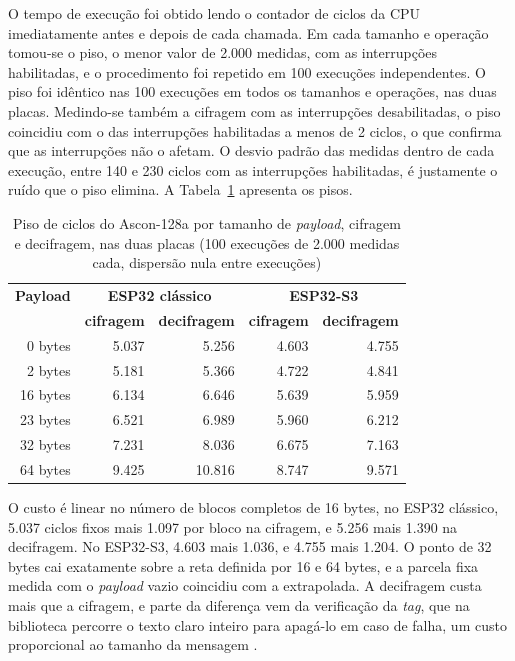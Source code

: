 O tempo de execução foi obtido lendo o contador de ciclos da CPU imediatamente antes e depois de cada chamada. Em cada tamanho e operação tomou-se o piso, o menor valor de 2.000 medidas, com as interrupções habilitadas, e o procedimento foi repetido em 100 execuções independentes. O piso foi idêntico nas 100 execuções em todos os tamanhos e operações, nas duas placas. Medindo-se também a cifragem com as interrupções desabilitadas, o piso coincidiu com o das interrupções habilitadas a menos de 2 ciclos, o que confirma que as interrupções não o afetam. O desvio padrão das medidas dentro de cada execução, entre 140 e 230 ciclos com as interrupções habilitadas, é justamente o ruído que o piso elimina. A Tabela~\ref{tab:tempo_ascon128a} apresenta os pisos.

\begin{table}[htb]
\centering
\caption{Piso de ciclos do Ascon-128a por tamanho de \textit{payload}, cifragem e decifragem, nas duas placas (100 execuções de 2.000 medidas cada, dispersão nula entre execuções)}
\label{tab:tempo_ascon128a}
\begin{tabular}{rrrrr}
\hline
\textbf{Payload} & \multicolumn{2}{c}{\textbf{ESP32 clássico}} & \multicolumn{2}{c}{\textbf{ESP32-S3}} \\
 & \textbf{cifragem} & \textbf{decifragem} & \textbf{cifragem} & \textbf{decifragem} \\
\hline
0 bytes  & 5.037 & 5.256  & 4.603 & 4.755 \\
2 bytes  & 5.181 & 5.366  & 4.722 & 4.841 \\
16 bytes & 6.134 & 6.646  & 5.639 & 5.959 \\
23 bytes & 6.521 & 6.989  & 5.960 & 6.212 \\
32 bytes & 7.231 & 8.036  & 6.675 & 7.163 \\
64 bytes & 9.425 & 10.816 & 8.747 & 9.571 \\
\hline
\end{tabular}
\end{table}

O custo é linear no número de blocos completos de 16 bytes, no ESP32 clássico, 5.037 ciclos fixos mais 1.097 por bloco na cifragem, e 5.256 mais 1.390 na decifragem. No ESP32-S3, 4.603 mais 1.036, e 4.755 mais 1.204. O ponto de 32 bytes cai exatamente sobre a reta definida por 16 e 64 bytes, e a parcela fixa medida com o \textit{payload} vazio coincidiu com a extrapolada. A decifragem custa mais que a cifragem, e parte da diferença vem da verificação da \textit{tag}, que na biblioteca percorre o texto claro inteiro para apagá-lo em caso de falha, um custo proporcional ao tamanho da mensagem \cite{weatherley2023ascon}.

